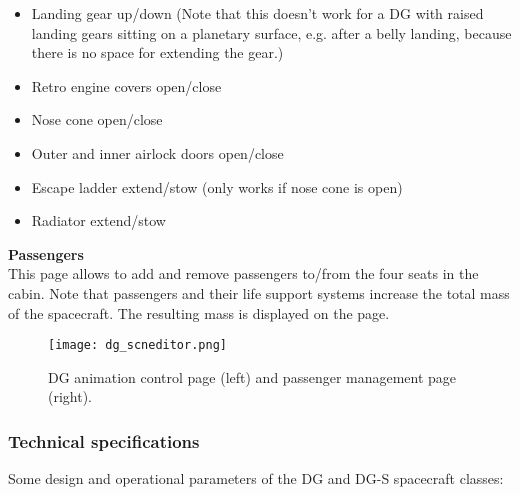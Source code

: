 \documentclass[Orbiter User Manual.tex]{subfiles}
\begin{document}
\begin{itemize} 
\item Landing gear up/down (Note that this doesn't work for a DG with raised landing gears sitting on a planetary surface, e.g. after a belly landing, because there is no space for extending the gear.)
\item Retro engine covers open/close
\item Nose cone open/close
\item Outer and inner airlock doors open/close
\item Escape ladder extend/stow (only works if nose cone is open)
\item Radiator extend/stow
\end{itemize}

\noindent
\textbf{Passengers}\\
This page allows to add and remove passengers to/from the four seats in the cabin. Note that passengers and their life support systems increase the total mass of the spacecraft. The resulting mass is displayed on the page. 

\begin{figure}[H]
  \centering
  \texttt{[image: dg\_scneditor.png]}
  \caption{DG animation control page (left) and passenger management page (right).}
\end{figure}


\subsubsection{Technical specifications}
Some design and operational parameters of the DG and DG-S spacecraft classes:
\end{document}

